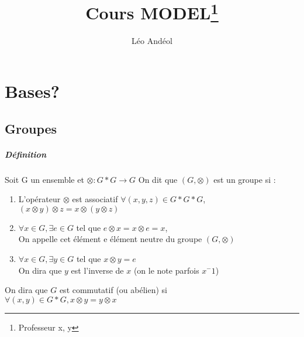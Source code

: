 \documentclass{report}
\title{Cours MODEL\thanks{Professeur x, y}}
\author{Léo Andéol}
\begin{document}
	\maketitle
	\chapter{Bases?}
	\section{Groupes}
	\paragraph{Définition} 
	Soit G un ensemble et $\otimes : G*G \to G$
	On dit que $(G,\otimes)$ est un groupe si :
	\begin{enumerate}
		\item L'opérateur $\otimes$ est associatif $\forall(x,y,z) \in G*G*G$, \newline
		$(x \otimes y)\otimes z = x \otimes (y \otimes z)$
		\item $\forall x \in G, \exists e \in G$ tel que $e \otimes x = x \otimes e = x$,\\
		On appelle cet élément e élément neutre du groupe $(G,\otimes)$
		\item $\forall x \in G, \exists y \in G$ tel que $x \otimes y = e$ \\
		On dira que $y$ est l'inverse de $x$ (on le note parfois $x^-1$)
	\end{enumerate}
	On dira que $G$ est commutatif (ou abélien) si\\
	$\forall(x,y)\in G*G, x\otimes y = y\otimes x$
\end{document}
